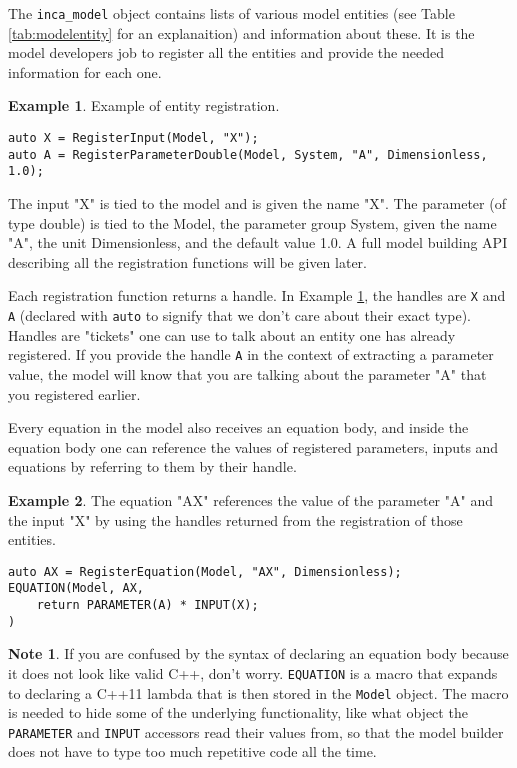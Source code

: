 \documentclass[11pt]{article}
\theoremstyle{definition}
\newtheorem{mynote}{Note}
\newenvironment{note}%
  {\begin{lrbox}{\notebox}%
   \begin{minipage}{\dimexpr\linewidth-2\fboxsep}
   \begin{mynote}}%
  {\end{mynote}%
   \end{minipage}%
   \end{lrbox}%
   \begin{trivlist}
     \item[]\colorbox{silver}{\usebox\notebox}
   \end{trivlist}}
\newtheorem{myexample}{Example}
\newenvironment{example}%
  {\begin{lrbox}{\examplebox}%
   \begin{minipage}{\dimexpr\linewidth-2\fboxsep}
   \begin{myexample}}%
  {\end{myexample}%
   \end{minipage}%
   \end{lrbox}%
   \begin{trivlist}
     \item[]\colorbox{silver}{\usebox\examplebox}
   \end{trivlist}}
\begin{document}
The {\tt inca\_model} object contains lists of various model entities (see Table \ref{tab:modelentity} for an explanaition) and information about these. It is the model developers job to register all the entities and provide the needed information for each one.

\begin{example}\label{ex:registration}
Example of entity registration.
\begin{lstlisting}[style=mycpp]
auto X = RegisterInput(Model, "X");
auto A = RegisterParameterDouble(Model, System, "A", Dimensionless, 1.0);
\end{lstlisting}
The input "X" is tied to the model and is given the name "X". The parameter (of type double) is tied to the Model, the parameter group System, given the name "A", the unit Dimensionless, and the default value 1.0. A full model building API describing all the registration functions will be given later.
\end{example}

Each registration function returns a handle. In Example \ref{ex:registration}, the handles are {\tt X} and {\tt A} (declared with {\tt auto} to signify that we don't care about their exact type). Handles are "tickets" one can use to talk about an entity one has already registered. If you provide the handle {\tt A} in the context of extracting a parameter value, the model will know that you are talking about the parameter "A" that you registered earlier.

Every equation in the model also receives an equation body, and inside the equation body one can reference the values of registered parameters, inputs and equations by referring to them by their handle.

\begin{example}\label{ex:equation}
The equation "AX" references the value of the parameter "A" and the input "X" by using the handles returned from the registration of those entities.
\begin{lstlisting}[style=mycpp]
auto AX = RegisterEquation(Model, "AX", Dimensionless);
EQUATION(Model, AX,
	return PARAMETER(A) * INPUT(X);
)
\end{lstlisting}
\end{example}

\begin{note}
If you are confused by the syntax of declaring an equation body because it does not look like valid C++, don't worry. {\tt EQUATION} is a macro that expands to declaring a C++11 lambda that is then stored in the {\tt Model} object. The macro is needed to hide some of the underlying functionality, like what object the {\tt PARAMETER} and {\tt INPUT} accessors read their values from, so that the model builder does not have to type too much repetitive code all the time.
\end{note}
\end{document}
